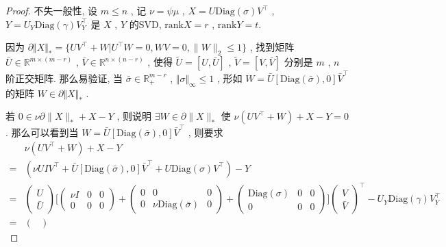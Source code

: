 \documentclass[UTF8]{ctexart}
\newcommand{\norm}[1]{\lVert#1\rVert}
\newcommand{\Real}[1]{\mathbb{R}^{#1}}
\newcommand{\nunorm}{\norm{X}_*}
\numberwithin{equation}{section}
\begin{document}
			\begin{proof}
				\quad 不失一般性, 设 $m \le n$ , 记 $\nu = \psi \mu$ , $X = U \text{Diag}(\sigma) V ^\top$ , $Y = U_Y \text{Diag}(\gamma) V_Y ^\top$ 是 $X$ , $Y$ 的SVD, $\text{rank} X = r$ , $\text{rank} Y = t$.
			
				因为 $\partial \Vert{X}\Vert_* = \{UV^\top+W\vert U^\top W=0,WV=0,\norm{W}_2\leq1\}$ , 找到矩阵 $\bar{U} \in \Real{m \times (m - r)}$ , $\bar{V} \in \Real{n \times (n - r)}$ , 使得 $\tilde{U} = [U, \bar{U}]$ , $\tilde{V} = [V, \bar{V}]$ 分别是 $m$ , $n$ 阶正交矩阵. 那么易验证, 当 $\bar{\sigma} \in \Real{m-r}_+$ , $\Vert{\sigma}\Vert_\infty \le 1$ , 形如 $W = \bar{U}[\text{Diag}(\bar{\sigma}), 0]\bar{V} ^\top$ 的矩阵 $W \in \partial \Vert{X}\Vert_*$ .

				若 $0 \in \nu \partial \nunorm + X -Y$ , 则说明 $\exists W \in \partial \nunorm$ 使 $\nu (UV ^\top + W) + X -Y = 0$ . 那么可以看到当 $W = \bar{U}[\text{Diag}(\bar{\sigma}), 0]\bar{V} ^\top$ , 则要求
				\begin{equation}
					\begin{split}\label{ShinkageCondition}
							&\nu (UV ^\top + W) + X -Y\\
						=	&(\nu U I V ^\top + \bar{U}[\text{Diag}(\bar{\sigma}), 0]\bar{V} ^\top + U \text{Diag}(\sigma) V ^\top) - Y\\
						=	&\begin{pmatrix}
								U \\ \bar{U}
							\end{pmatrix}
							\Bigg [
								\begin{pmatrix}
									\nu I & 0 & 0\\
									0 & 0 & 0
								\end{pmatrix}
								+
								\begin{pmatrix}
									0 & 0 & 0\\
									0 & \nu \text{Diag}(\bar{\sigma}) & 0
								\end{pmatrix}
								+
								\begin{pmatrix}
									\text{Diag}(\sigma) & 0 & 0\\
									0 & 0 & 0
								\end{pmatrix}
								\Bigg ]
							\begin{pmatrix}
								V \\ \bar{V}
							\end{pmatrix} ^\top 
							- U_Y \text{Diag}(\gamma) V_Y ^\top\\
						=	&\begin{pmatrix}

\end{pmatrix}
\end{split}
\end{equation}
\end{proof}
\end{document}
